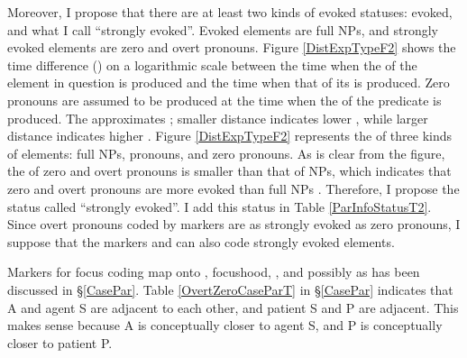 Moreover,
I propose that there are at least two kinds of evoked statuses: evoked, and what I call ``strongly evoked''.
Evoked elements are full NPs, and
strongly evoked elements are zero and overt pronouns.
Figure \ref{DistExpTypeF2} shows the time difference () on a logarithmic scale between the time when the  of the element in question is produced and the time when that of its  is produced.
Zero pronouns are assumed to be produced at the time when
the  of the predicate is produced.
The  approximates ;
smaller distance indicates lower ,
while larger distance indicates higher .
Figure \ref{DistExpTypeF2} represents the  of three kinds of elements:
full NPs, pronouns, and zero pronouns.
As is clear from the figure,
the  of zero and overt pronouns is smaller than
that of NPs,
which indicates that
zero and overt pronouns are more evoked than full NPs .
Therefore, I propose the status called ``strongly evoked''.
I add this status in Table \ref{ParInfoStatusT2}.
Since overt pronouns coded by  markers are as strongly evoked as zero pronouns,
I suppose that the  markers  and  can also code strongly evoked elements.

Markers for focus coding map onto , focushood, , and possibly 
as has been discussed in \S \ref{CasePar}.
Table \ref{OvertZeroCaseParT} in \S \ref{CasePar} indicates that
A and agent S are adjacent to each other, and
patient S and P are adjacent.
This makes sense because
A is conceptually closer to agent S, and
P is conceptually closer to patient P.

